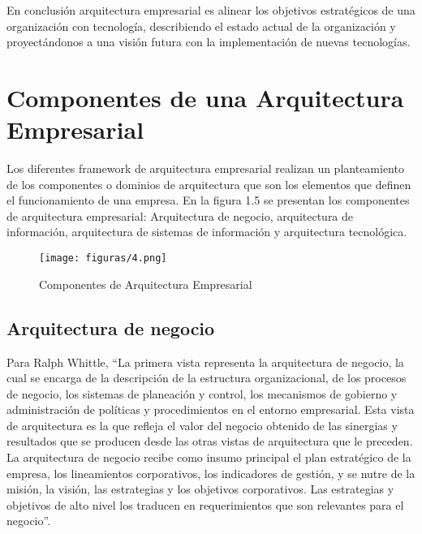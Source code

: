   En conclusión arquitectura empresarial es alinear los objetivos estratégicos de una organización con tecnología, describiendo el estado actual de la organización y proyectándonos a una visión futura con la implementación de nuevas tecnologías.
  
\section{Componentes de una Arquitectura Empresarial}
Los diferentes framework de arquitectura empresarial realizan un planteamiento de los componentes o dominios de arquitectura que son los elementos que definen el funcionamiento de una empresa. En la figura 1.5 se presentan los componentes de arquitectura empresarial: Arquitectura de negocio, arquitectura de información, arquitectura de sistemas de información y arquitectura tecnológica.
  
  \begin{figure}[!h]
  	\centering
  	\texttt{[image: figuras/4.png]}
   	\captionsetup{width=.95\textwidth}
   	\caption{Componentes de Arquitectura Empresarial}
   	\label{figura4}
  \end{figure}
  
  \subsection{Arquitectura de negocio}
  Para Ralph Whittle, “La primera vista representa la arquitectura de negocio, la cual se encarga de la descripción de la estructura organizacional, de los procesos de negocio, los sistemas de planeación y control, los mecanismos de gobierno y administración de políticas y procedimientos en el entorno empresarial. Esta vista de arquitectura es la que refleja el valor del negocio obtenido de las sinergias y resultados que se producen desde las otras vistas de arquitectura que le preceden. La arquitectura de negocio recibe como insumo principal el plan estratégico de la empresa, los lineamientos corporativos, los indicadores de gestión, y se nutre de la misión, la visión, las estrategias y los objetivos corporativos. Las estrategias y objetivos de alto nivel los traducen en requerimientos que son relevantes para el negocio”.
